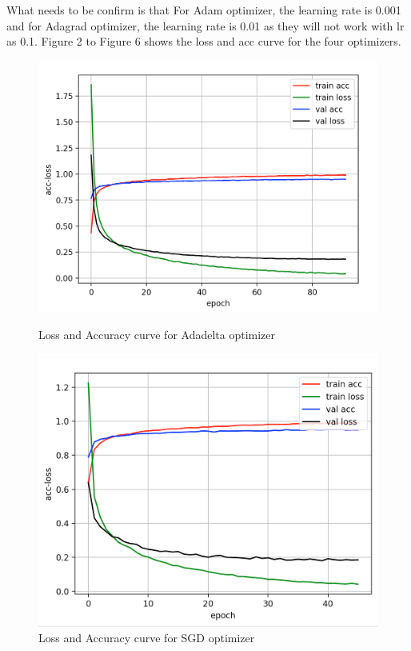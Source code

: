 \documentclass{article}
\begin{document}
What needs to be confirm is that For Adam optimizer, the learning rate is 0.001 and for Adagrad optimizer, the learning rate is 0.01 as they will not work with lr as 0.1. Figure 2 to Figure 6 shows the loss and acc curve for the four optimizers.


\begin{figure}[htbp]
\centering
\begin{minipage}[t]{0.48\textwidth}
\centering
\includegraphics[scale = 0.3]{adaelta.png}
\caption{Loss and Accuracy curve for Adadelta optimizer}
\end{minipage}
\begin{minipage}[t]{0.48\textwidth}
\centering
\includegraphics[scale = 0.3]{sgd.png}
\caption{Loss and Accuracy curve for SGD optimizer}
\end{minipage}
\end{figure}
\end{document}
